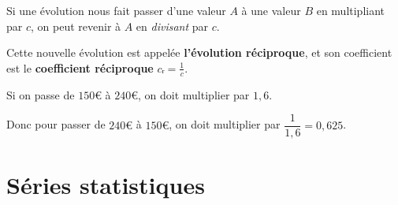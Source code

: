 \documentclass[
	classe=$2^{de}$
]{coursclass}
\begin{document}
\begin{propriete}
	Si une évolution nous fait passer d'une valeur $A$ à une valeur $B$ en multipliant par $c$, on peut revenir à $A$ en \textit{divisant} par $c$.

	Cette nouvelle évolution est appelée \textbf{l'évolution réciproque}, et son coefficient est le \textbf{coefficient réciproque} $cᵣ = \frac{1}{c}$.
\end{propriete}

\begin{exemple}
	Si on passe de $150€$ à $240€$, on doit multiplier par $1,6$. \medskip

	Donc pour passer de $240€$ à $150€$, on doit multiplier par $\dfrac{1}{1,6} = 0,625$.
\end{exemple}

\section{Séries statistiques}
\end{document}

